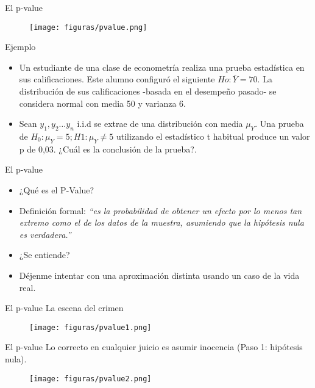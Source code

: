 \begin{frame}{El p-value}
	\begin{figure}
		\centering
		\texttt{[image: figuras/pvalue.png]}
	\end{figure}
\end{frame}
\begin{frame}{Ejemplo}
	\begin{itemize}
		\item Un estudiante de una clase de econometría realiza una prueba estadística en sus calificaciones. Este alumno configuró el siguiente $Ho: \overline{Y} = 70$. La distribución de sus calificaciones -basada en el desempeño pasado- se considera normal con media 50 y varianza 6.
		\item Sean $y_1, y_2 \ldots y_n$ i.i.d se extrae de una distribución con media $\mu_{Y}$. Una prueba de $H_0: \mu_{Y} = 5; H1: \mu_{Y} \neq 5$ utilizando el estadístico t habitual produce un valor p de 0,03. ¿Cuál es la conclusión de la prueba?.
	\end{itemize}
\end{frame}
\begin{frame}{El p-value}
	\begin{itemize}
		\item ¿Qué es el P-Value?
		\item Definición formal:
				{\centering \textit{``es la probabilidad de obtener un efecto por lo menos tan extremo como el de los datos de la muestra, asumiendo que la hipótesis nula es verdadera.''}}
		\item ¿Se entiende?
		\item Déjenme intentar con una aproximación distinta usando un caso de la vida real.
	\end{itemize}
\end{frame}
\begin{frame}{El p-value}
	La escena del crimen
	\begin{figure}
		\centering
		\texttt{[image: figuras/pvalue1.png]}
	\end{figure}
\end{frame}
\begin{frame}{El p-value}
	Lo correcto en cualquier juicio es asumir inocencia (Paso 1: hipótesis nula).
	\begin{figure}
		\centering
		\texttt{[image: figuras/pvalue2.png]}
	\end{figure}
\end{frame}
